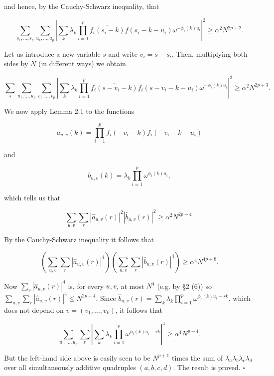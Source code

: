 \documentclass[10pt]{article}
\begin{document}
and hence, by the Cauchy-Schwarz inequality, that

$$
\sum_{s_{1}, \ldots, s_{p}} \sum_{u_{1}, \ldots, u_{p}}\left|\sum_{k} \lambda_{k} \prod_{i=1}^{p} \overline{f_{i}\left(s_{i}-k\right)} f\left(s_{i}-k-u_{i}\right) \omega^{-\phi_{i}(k) u_{i}}\right|^{2} \geqslant \alpha^{2} N^{2 p+2} .
$$

Let us introduce a new variable $s$ and write $v_{i}=s-s_{i}$. Then, multiplying both sides by $N$ (in different ways) we obtain

$$
\sum_{s} \sum_{u_{1}, \ldots, u_{p}} \sum_{v_{1}, \ldots, v_{p}}\left|\sum_{k} \lambda_{k} \prod_{i=1}^{p} \overline{f_{i}\left(s-v_{i}-k\right)} f_{i}\left(s-v_{i}-k-u_{i}\right) \omega^{-\phi_{i}(k) u_{i}}\right|^{2} \geqslant \alpha^{2} N^{2 p+3} .
$$

We now apply Lemma 2.1 to the functions

$$
a_{u, v}(k)=\prod_{i=1}^{p} \overline{f_{i}\left(-v_{i}-k\right)} f_{i}\left(-v_{i}-k-u_{i}\right)
$$

and

$$
b_{u, v}(k)=\lambda_{k} \prod_{i=1}^{p} \omega^{\phi_{i}(k) u_{i}},
$$

which tells us that

$$
\sum_{u, v} \sum_{r}\left|\hat{a}_{u, v}(r)\right|^{2}\left|\hat{b}_{u, v}(r)\right|^{2} \geqslant \alpha^{2} N^{2 p+4} .
$$

By the Cauchy-Schwarz inequality it follows that

$$
\left(\sum_{u, v} \sum_{r}\left|\hat{a}_{u, v}(r)\right|^{4}\right)\left(\sum_{u, v} \sum_{r}\left|\hat{b}_{u, v}(r)\right|^{4}\right) \geqslant \alpha^{4} N^{4 p+8} .
$$

Now $\sum_{r}\left|\hat{a}_{u, v}(r)\right|^{4}$ is, for every $u, v$, at most $N^{4}$ (e.g. by §2 (6)) so $\sum_{u, v} \sum_{r}\left|\hat{a}_{u, v}(r)\right|^{4} \leqslant N^{2 p+4}$. Since $\hat{b}_{u, v}(r)=\sum_{k} \lambda_{k} \prod_{i=1}^{p} \omega^{\phi_{i}(k) u_{i}-r k}$, which does not depend on $v=\left(v_{1}, \ldots, v_{k}\right)$, it follows that

$$
\sum_{u_{1}, \ldots, u_{p}} \sum_{r}\left|\sum_{k} \lambda_{k} \prod_{i=1}^{p} \omega^{\phi_{i}(k) u_{i}-r k}\right|^{4} \geqslant \alpha^{4} N^{p+4} .
$$

But the left-hand side above is easily seen to be $N^{p+1}$ times the sum of $\lambda_{a} \lambda_{b} \lambda_{c} \lambda_{d}$ over all simultaneously additive quadruples $(a, b, c, d)$. The result is proved. \(\square\)
\end{document}
